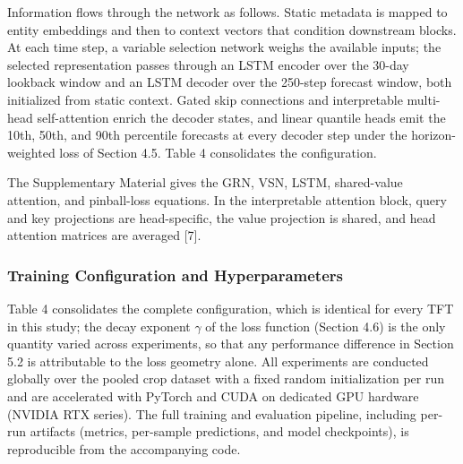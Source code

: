 \documentclass[review,3p,times]{elsarticle}
\begin{document}
Information flows through the network as follows. Static metadata is mapped to entity embeddings and then to context vectors that condition downstream blocks. At each time step, a variable selection network weighs the available inputs; the selected representation passes through an LSTM encoder over the 30-day lookback window and an LSTM decoder over the 250-step forecast window, both initialized from static context. Gated skip connections and interpretable multi-head self-attention enrich the decoder states, and linear quantile heads emit the 10th, 50th, and 90th percentile forecasts at every decoder step under the horizon-weighted loss of Section 4.5. Table 4 consolidates the configuration.

The Supplementary Material gives the GRN, VSN, LSTM, shared-value attention, and pinball-loss equations. In the interpretable attention block, query and key projections are head-specific, the value projection is shared, and head attention matrices are averaged [7].


\subsubsection{Training Configuration and Hyperparameters}
Table 4 consolidates the complete configuration, which is identical for every TFT in this study; the decay exponent $\gamma$ of the loss function (Section 4.6) is the only quantity varied across experiments, so that any performance difference in Section 5.2 is attributable to the loss geometry alone. All experiments are conducted globally over the pooled crop dataset with a fixed random initialization per run and are accelerated with PyTorch and CUDA on dedicated GPU hardware (NVIDIA RTX series). The full training and evaluation pipeline, including per-run artifacts (metrics, per-sample predictions, and model checkpoints), is reproducible from the accompanying code.
\end{document}
